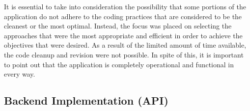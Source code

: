 \begin{justify}
    \vspace{0.25cm}
    \newendline It is essential to take into consideration the possibility that some portions of the application do not adhere to the coding practices that are considered to be the cleanest or the most optimal. Instead, the focus was placed on selecting the approaches that were the most appropriate and efficient in order to achieve the objectives that were desired. As a result of the limited amount of time available, the code cleanup and revision were not possible. In spite of this, it is important to point out that the application is completely operational and functional in every way.\\    
\end{justify}
\clearpage

\subsection{Backend Implementation (API)}
